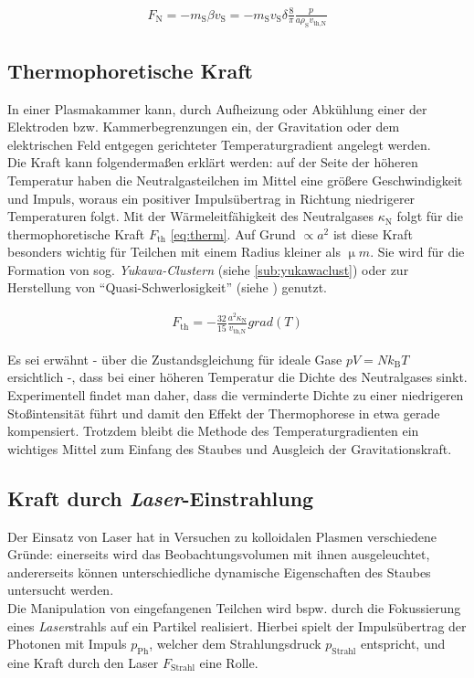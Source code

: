 \documentclass[numbers=noenddot,a4paper,notitlepage,twoside,BCOR15mm]{scrbook}
\newcommand{\ix}[1]{_\text{#1}}
\newcommand{\tilt}[1]{\textit{#1}}
\newcommand{\grad}[1]{\textit{grad}\left(#1\right)}
\begin{document}
				\begin{align}
					F\ix{N}=-m\ix{S}\beta v\ix{S}=-m\ix{S}v\ix{S}\delta\frac{8}{\pi}\frac{p}{a\rho\ix{S}v\ix{th,N}}
				\end{align}

		\subsection{Thermophoretische Kraft}\label{subsub:therm}

			In einer Plasmakammer kann, durch Aufheizung oder Abkühlung einer der Elektroden bzw. Kammerbegrenzungen ein, der Gravitation oder dem elektrischen Feld entgegen gerichteter Temperaturgradient angelegt werden.\\
			Die Kraft kann folgendermaßen erklärt werden: auf der Seite der höheren Temperatur haben die Neutralgasteilchen im Mittel eine größere Geschwindigkeit und Impuls, woraus ein positiver Impulsübertrag in Richtung niedrigerer Temperaturen folgt.	Mit der Wärmeleitfähigkeit des Neutralgases $\kappa\ix{N}$ folgt für die thermophoretische Kraft $F\ix{th}$ \autoref{eq:therm}. Auf Grund $\propto a^2$ ist diese Kraft besonders wichtig für Teilchen mit einem Radius kleiner als $\unit{\upmu m}$. Sie wird für die Formation von sog. \tilt{Yukawa-Clustern} (siehe \ref{sub:yukawaclust}) oder zur Herstellung von "`Quasi-Schwerlosigkeit"' (siehe \cite{Rothermel02}) genutzt.

				\begin{align}
					F\ix{th}=-\frac{32}{15}\frac{a^2 \kappa\ix{N}}{v\ix{th,N}}\grad{T} \label{eq:therm}
				\end{align}

			Es sei erwähnt -  über die Zustandsgleichung für ideale Gase $pV=Nk\ix{B}T$ ersichtlich -, dass bei einer höheren Temperatur die Dichte des Neutralgases sinkt. Experimentell findet man daher, dass die verminderte Dichte zu einer niedrigeren Stoßintensität führt und damit den Effekt der Thermophorese in etwa gerade kompensiert. Trotzdem bleibt die Methode des Temperaturgradienten ein wichtiges Mittel zum Einfang des Staubes und Ausgleich der Gravitationskraft.

		\subsection{Kraft durch \tilt{Laser}-Einstrahlung}\label{subsub:laser}

			Der Einsatz von Laser hat in Versuchen zu kolloidalen Plasmen verschiedene Gründe: einerseits wird das Beobachtungsvolumen mit ihnen ausgeleuchtet, andererseits können unterschiedliche dynamische Eigenschaften des Staubes untersucht werden.\\
			Die Manipulation von eingefangenen Teilchen wird bspw. durch die Fokussierung eines \tilt{Laser}strahls auf ein Partikel realisiert. Hierbei spielt der Impulsübertrag der Photonen mit Impuls $p\ix{Ph}$, welcher dem Strahlungsdruck $p\ix{Strahl}$ entspricht, und eine Kraft durch den Laser $F\ix{Strahl}$ \cite{Ashkin70} eine Rolle.
\end{document}
